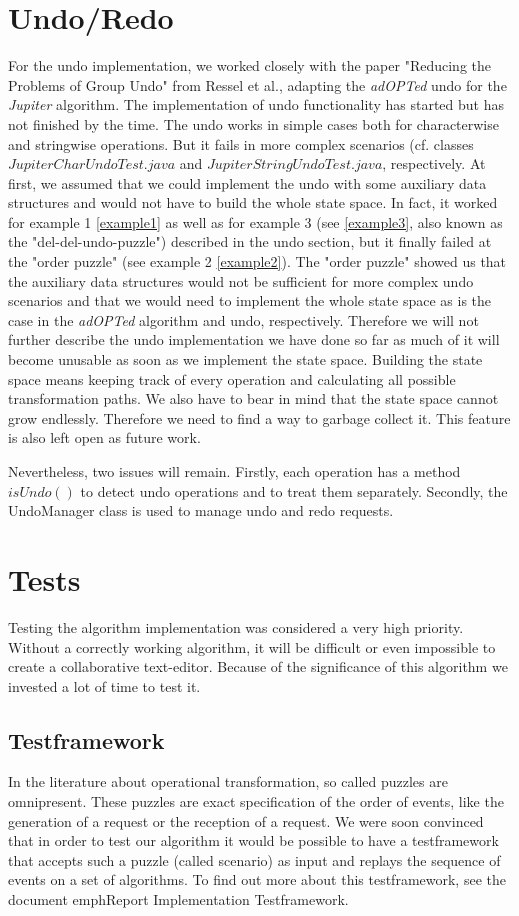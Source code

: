 \section{Undo/Redo}
\label{undo_redo}
For the undo implementation, we worked closely with the paper "Reducing the Problems of Group Undo" from Ressel et al., adapting the \emph{adOPTed} undo for the \emph{Jupiter} algorithm. 
The implementation of undo functionality has started but has not finished by the time. The undo works in simple cases both for characterwise and stringwise operations. But it fails in more complex scenarios (cf. classes $JupiterCharUndoTest.java$ and $JupiterStringUndoTest.java$, respectively. At first, we assumed that we could implement the undo with some auxiliary data structures and would not have to build the whole state space. In fact, it worked for example 1 \ref{example1} as well as for example 3 (see \ref{example3}, also known as the "del-del-undo-puzzle") described in the undo section, but it finally failed at the "order puzzle" (see example 2 \ref{example2}). The "order puzzle" showed us that the auxiliary data structures would not be sufficient for more complex undo scenarios and that we would need to implement the whole state space as is the case in the \emph{adOPTed} algorithm and undo, respectively. 
Therefore we will not further describe the undo implementation we have done so far as much of it will become unusable as soon as we implement the state space. Building the state space means keeping track of every operation and calculating all possible transformation paths. We also have to bear in mind that the state space cannot grow endlessly. Therefore we need to find a way to garbage collect it. This feature is also left open as future work.

Nevertheless, two issues will remain. Firstly, each operation has a method $isUndo()$ to detect undo operations and to treat them separately. Secondly, the UndoManager class is used to manage undo and redo requests.

\section{Tests}
Testing the algorithm implementation was considered a very high priority. Without a correctly working algorithm, it will be difficult or even impossible to create a collaborative text-editor. Because of the significance of this algorithm we invested a lot of time to test it.

\subsection{Testframework}
In the literature about operational transformation, so called puzzles are omnipresent. These puzzles are exact specification of the order of events, like the generation of a request or the reception of a request. We were soon convinced that in order to test our algorithm it would be possible to have a testframework that accepts such a puzzle (called scenario) as input and replays the sequence of events on a set of algorithms. To find out more about this testframework, see the document emph{Report Implementation Testframework}.

